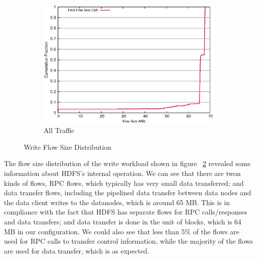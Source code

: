 \begin{figure}[!htpb]
\begin{subfigure}[b]{.55\linewidth}
	\includegraphics[width=.99\textwidth]{figures/6writes/flow_size.eps}
	\caption{All Traffic}\label{fig:write_size:all}
   \end{subfigure}%
\caption{Write Flow Size Distribution}
\label{fig:write_size}
\end{figure}


The flow size distribution of the write workload shown in figure ~\ref{fig:write_size} revealed some information about HDFS's internal operation. We can see that there are twon kinds of flows, RPC flows, which typically has very small data transferred; and data transfer flows, including the pipelined data transfer between data nodes and the data client writes to the datanodes, which is around 65 MB. This is in compliance with the fact that HDFS has separate flows for RPC calls/responses and data transfers; and data transfer is done in the unit of blocks, which is 64 MB in our configuration. We could also see that less than 5\% of the flows are used for RPC calls to transfer control information, while the majority of the flows are used for data transfer, which is as expected. 

